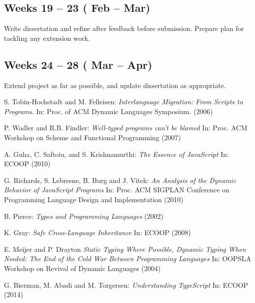 \documentclass{article}
\begin{document}
		\subsection*{Weeks 19 -- 23 ( Feb --  Mar)}
		Write dissertation and refine after feedback before submission. Prepare
		plan for tackling any extension work.
		
		\subsection*{Weeks 24 -- 28 ( Mar --  Apr)}
		Extend project as far as possible, and update dissertation as
		appropriate.

	\begin{thebibliography}{9}

		S. Tobin-Hochstadt and M. Felleisen:
		\emph{Interlanguage Migration: From Scripts to Programs}.
		In: Proc. of ACM Dynamic Languages Symposium. (2006)

		 P. Wadler and R.B. Findler: 
		\emph{Well-typed programs can't be blamed}
		In: Proc. ACM Workshop on Scheme and Functional Programming (2007)

		 A. Guha, C. Saftoiu, and S. Krishnamurthi: 
		\emph{The Essence of JavaScript}
		In: ECOOP (2010)

		 G. Richards, S. Lebresne, B. Burg and J. Vitek:
		\emph{An Analysis of the Dynamic Behavior of JavaScript Programs}
		In: Proc. ACM SIGPLAN Conference on Programming Language Design and Implementation (2010)

		 B. Pierce:
		\emph{Types and Programming Languages} (2002)

		 K. Gray: 
		\emph{Safe Cross-Language Inheritance}
		In: ECOOP (2008)

		 E. Meijer and P. Drayton
		\emph{Static Typing Where Possible, Dynamic Typing When Needed: The End of the Cold War Between Programming Languages}
		In: OOPSLA Workshop on Revival of Dynamic Languages (2004)

		 G. Bierman, M. Abadi and M. Torgersen: 
		\emph{Understanding TypeScript}
		In: ECOOP (2014)

	\end{thebibliography}
\end{document}
